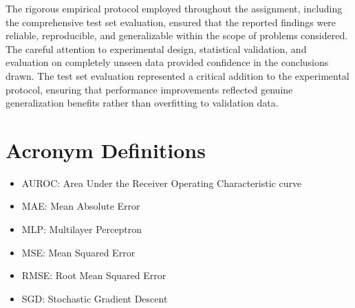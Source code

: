 \documentclass[conference]{IEEEtran}
\begin{document}
The rigorous empirical protocol employed throughout the assignment, including the comprehensive test set evaluation, ensured that the reported findings were reliable, reproducible, and generalizable within the scope of problems considered. The careful attention to experimental design, statistical validation, and evaluation on completely unseen data provided confidence in the conclusions drawn. The test set evaluation represented a critical addition to the experimental protocol, ensuring that performance improvements reflected genuine generalization benefits rather than overfitting to validation data.




\section*{Acronym Definitions}
\begin{itemize}
\item AUROC: Area Under the Receiver Operating Characteristic curve
\item MAE: Mean Absolute Error
\item MLP: Multilayer Perceptron
\item MSE: Mean Squared Error
\item RMSE: Root Mean Squared Error
\item SGD: Stochastic Gradient Descent
\end{itemize}
\end{document}

